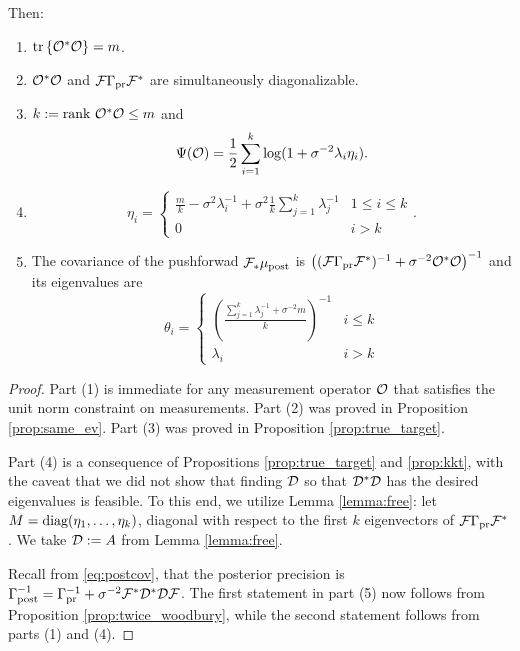 \begin{theorem}
  Then:
  \begin{enumerate}
  \item  \(\textup{tr}\left \{\mathcal{O}^*\mathcal{O} \right \} = m\).
  \item \(\mathcal{O}^*\mathcal{O}\) and \(\mathcal{F}\Gamma_{\textup{pr}}\mathcal{F}^*\) are simultaneously
    diagonalizable.
  \item \(k := \textup{rank}\  \mathcal{O}^*\mathcal{O} \leq m\) and
    \begin{equation*}
      \tar(\obs) = \frac12 \sum_{i=1}^{k} \log (1 + \sigma^{-2}\lambda_i\eta_i). %
    \end{equation*}
  \item
    \begin{equation*}
        \eta_i = \begin{cases}
          \frac{m}{k} - \sigma^2 \lambda_i^{-1} + \sigma^2 \frac{1}{k} \sum_{j=1}^k \lambda_j^{-1} & 1 \leq i \leq k \\
          0 & i > k 
        \end{cases}.
    \end{equation*}
  \item The covariance of the pushforwad \(\mathcal{F}_{*} \mu_{\textup{post}}\) is \(\left
    ( (\mathcal{F} \Gamma_{\textup{pr}} \mathcal{F}^*)^{-1} + \sigma^{-2} \mathcal{O}^*\mathcal{O} \right
    )^{-1}\) and its eigenvalues are
    \begin{equation*}
      \theta_i =
      \begin{cases}
        \left(\frac{\sum_{j=1}^k \lambda_j^{-1} + \sigma^{-2}m}{k} \right )^{-1} & i \leq k \\
        \lambda_i &  i > k 
      \end{cases}
    \end{equation*}
  \end{enumerate}
\end{theorem}
\begin{proof}
  Part (1) is immediate for any measurement operator $\mathcal{O}$ that
  satisfies the unit norm constraint on measurements. Part (2)
  was proved in Proposition \ref{prop:same_ev}. Part (3) was proved in
  Proposition \ref{prop:true_target}.
  
  Part (4) is a consequence of Propositions \ref{prop:true_target} and
  \ref{prop:kkt}, with the caveat that we did not show that finding
  $\mathcal{D}$ so that $\mathcal{D}^*\mathcal{D}$ has the desired eigenvalues is
  feasible. To this end, we utilize Lemma \ref{lemma:free}: let $M =
  \textup{diag}(\eta_1, \dots, \eta_k)$, diagonal with respect to the first
  $k$ eigenvectors of $\mathcal{F} \Gamma_{\textup{pr}} \mathcal{F}^*$. We take $\mathcal{D} := A$ from
  Lemma \ref{lemma:free}.
  
  Recall from \eqref{eq:postcov}, that the posterior precision is
  $\Gamma_{\textup{post}}^{-1} = \Gamma_{\textup{pr}}^{-1} + \sigma^{-2}\mathcal{F}^*\mathcal{D}^*\mathcal{D}\mathcal{F}$. The
  first statement in part (5) now follows from Proposition
  \ref{prop:twice_woodbury}, while the second statement follows from
  parts (1) and (4).
\end{proof}


